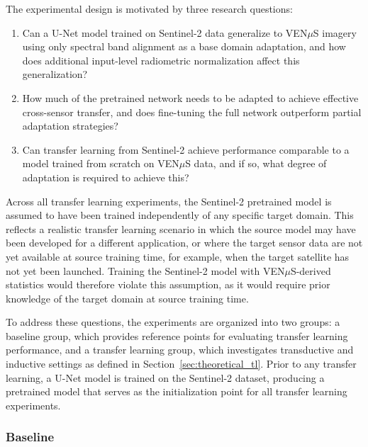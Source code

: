 The experimental design is motivated by three research questions:
\begin{enumerate}
    \item Can a U-Net model trained on Sentinel-2 data generalize to VEN$\mu$S imagery using only spectral band alignment as a base domain adaptation, and how does additional input-level radiometric normalization affect this generalization?
    
    \item How much of the pretrained network needs to be adapted to achieve effective cross-sensor transfer, and does fine-tuning the full network outperform partial adaptation strategies?
    
    \item Can transfer learning from Sentinel-2 achieve performance comparable to a model trained from scratch on VEN$\mu$S data, and if so, what degree of adaptation is required to achieve this?
\end{enumerate}

Across all transfer learning experiments, the Sentinel-2 pretrained model is assumed to have been trained independently of any specific target domain. This reflects a realistic transfer learning scenario in which the source model may have been developed for a different application, or where the target sensor data are not yet available at source training time, for example, when the target satellite has not yet been launched. Training the Sentinel-2 model with VEN$\mu$S-derived statistics would therefore violate this assumption, as it would require prior knowledge of the target domain at source training time.

To address these questions, the experiments are organized into two groups: a baseline group, which provides reference points for evaluating transfer learning performance, and a transfer learning group, which investigates transductive and inductive settings as defined in Section~\ref{sec:theoretical_tl}. Prior to any transfer learning, a U-Net model is trained on the Sentinel-2 dataset, producing a pretrained model that serves as the initialization point for all transfer learning experiments.

\subsubsection{Baseline}

